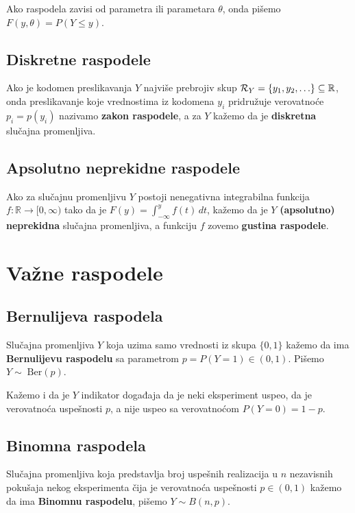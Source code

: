 \documentclass[twoside,titlepage,12pt,a4paper]{book}
\def\R{\mathbb{R}}
\numberwithin{equation}{chapter}
\begin{document}
Ako raspodela zavisi od parametra ili parametara $\theta$, onda pišemo $F ( y, \theta ) = P ( Y \le y )$.

\subsection{Diskretne raspodele}

Ako je kodomen preslikavanja $Y$ najviše prebrojiv skup ${\cal R}_Y = \{ y_1, y_2, \ldots \} \subseteq \R$, onda preslikavanje koje vrednostima iz kodomena $y_i$ pridružuje verovatnoće $p_i = p ( y_i )$ nazivamo \textbf{zakon raspodele}, a za $Y$ kažemo da je \textbf{diskretna} slučajna promenljiva.

\subsection{Apsolutno neprekidne raspodele}

Ako za slučajnu promenljivu $Y$ postoji nenegativna integrabilna funkcija $f : \R \rightarrow [ 0, \infty )$ tako da je $\displaystyle F ( y ) = \int_{-\infty}^y f ( t ) \, dt$, kažemo da je $Y$ \textbf{(apsolutno) neprekidna} slučajna promenljiva, a funkciju $f$ zovemo \textbf{gustina raspodele}.

\section{Važne raspodele}

\subsection{Bernulijeva raspodela}

Slučajna promenljiva $Y$ koja uzima samo vrednosti iz skupa $\{ 0, 1 \}$ kažemo da ima \textbf{Bernulijevu raspodelu} sa parametrom $p = P ( Y = 1 ) \in ( 0, 1 )$. Pišemo $Y \sim \;\mbox{Ber} ( p )$.

Kažemo i da je $Y$ indikator događaja da je neki eksperiment uspeo, da je verovatnoća uspešnosti $p$, a nije uspeo sa verovatnoćom $P ( Y = 0 ) = 1 - p$.

\subsection{Binomna raspodela}

Slučajna promenljiva koja predstavlja broj uspešnih realizacija u $n$ nezavisnih pokušaja nekog eksperimenta čija je verovatnoća uspešnosti $p \in ( 0, 1 )$ kažemo da ima \textbf{Binomnu raspodelu}, pišemo $Y \sim B ( n, p )$.
\end{document}
